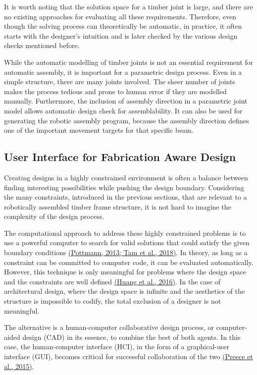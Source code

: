 \documentclass[11pt]{book}
\begin{document}
It is worth noting that the solution space for a timber joint is large, and there are no existing approaches for evaluating all these requirements. Therefore, even though the solving process can theoretically be automatic, in practice, it often starts with the designer’s intuition and is later checked by the various design checks mentioned before. 

While the automatic modelling of timber joints is not an essential requirement for automatic assembly, it is important for a parametric design process. Even in a simple structure, there are many joints involved. The sheer number of joints makes the process tedious and prone to human error if they are modelled manually. Furthermore, the inclusion of assembly direction in a parametric joint model allows automatic design check for assemblability. It can also be used for generating the robotic assembly program, because the assembly direction defines one of the important movement targets for that specific beam. 

\subsection{User Interface for Fabrication Aware Design}

Creating designs in a highly constrained environment is often a balance between finding interesting possibilities while pushing the design boundary. Considering the many constraints, introduced in the previous sections, that are relevant to a robotically assembled timber frame structure, it is not hard to imagine the complexity of the design process. 

The computational approach to address these highly constrained problems is to use a powerful computer to search for valid solutions that could satisfy the given boundary conditions \href{https://www.zotero.org/google-docs/?IhApCE}{(Pottmann, 2013; Tam et al., 2018)}. In theory, as long as a constraint can be committed to computer code, it can be evaluated automatically. However, this technique is only meaningful for problems where the design space and the constraints are well defined \href{https://www.zotero.org/google-docs/?5kfhGC}{(Huang et al., 2016)}. In the case of architectural design, where the design space is infinite and the aesthetics of the structure is impossible to codify, the total exclusion of a designer is not meaningful. 

The alternative is a human-computer collaborative design process, or computer-aided design (CAD) in its essence, to combine the best of both agents. In this case, the human-computer interface (HCI), in the form of a graphical-user interface (GUI), becomes critical for successful collaboration of the two \href{https://www.zotero.org/google-docs/?3vtUPQ}{(Preece et al., 2015)}. 
\end{document}
